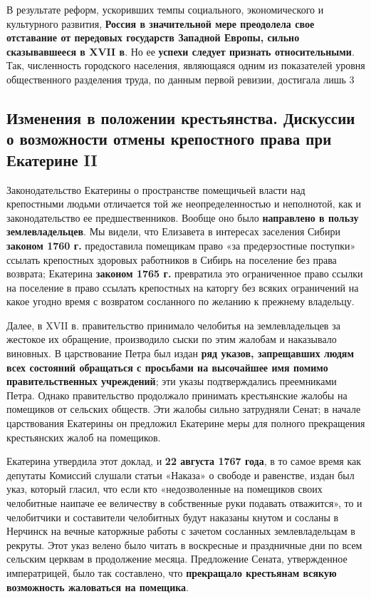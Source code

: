 \documentclass{article}
\begin{document}
В результате реформ, ускоривших темпы социального, экономического и культурного развития, \textbf{Россия в значительной мере преодолела свое отставание от передовых государств Западной Европы, сильно сказывавшееся в XVII в}. Но ее \textbf{успехи следует признать относительными}. Так, численность городского населения, являющаяся одним из показателей уровня общественного разделения труда, по данным первой ревизии, достигала лишь 3%

\subsection{Изменения в положении крестьянства. Дискуссии о возможности отмены крепостного права при Екатерине II}

Законодательство Екатерины о пространстве помещичьей власти над крепостными людьми отличается той же неопределенностью и неполнотой, как и законодательство ее предшественников. Вообще оно было \textbf{направлено в пользу землевладельцев}. Мы видели, что Елизавета в интересах заселения Сибири \textbf{законом 1760 г.} предоставила помещикам право «за предерзостные поступки» ссылать крепостных здоровых работников в Сибирь на поселение без права возврата; Екатерина \textbf{законом 1765 г.} превратила это ограниченное право ссылки на поселение в право ссылать крепостных на каторгу без всяких ограничений на какое угодно время с возвратом сосланного по желанию к прежнему владельцу.

\hfill

Далее, в XVII в. правительство принимало челобитья на землевладельцев за жестокое их обращение, производило сыски по этим жалобам и наказывало виновных. В царствование Петра был издан \textbf{ряд указов, запрещавших людям всех состояний обращаться с просьбами на высочайшее имя помимо правительственных учреждений}; эти указы подтверждались преемниками Петра. Однако правительство продолжало принимать крестьянские жалобы на помещиков от сельских обществ. Эти жалобы сильно затрудняли Сенат; в начале царствования Екатерины он предложил Екатерине меры для полного прекращения крестьянских жалоб на помещиков.

\hfill

Екатерина утвердила этот доклад, и \textbf{22 августа 1767 года}, в то самое время как депутаты Комиссий слушали статьи «Наказа» о свободе и равенстве, издан был указ, который гласил, что если кто «недозволенные на помещиков своих челобитные наипаче ее величеству в собственные руки подавать отважится», то и челобитчики и составители челобитных будут наказаны кнутом и сосланы в Нерчинск на вечные каторжные работы с зачетом сосланных землевладельцам в рекруты. Этот указ велено было читать в воскресные и праздничные дни по всем сельским церквам в продолжение месяца. Предложение Сената, утвержденное императрицей, было так составлено, что \textbf{прекращало крестьянам всякую возможность жаловаться на помещика}. 
\end{document}
